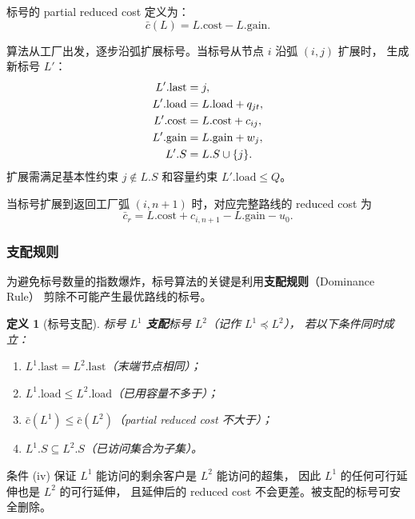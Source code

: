 \documentclass{article}
\newtheorem{definition}{定义}
\begin{document}
标号的 partial reduced cost 定义为：
\begin{equation}
\bar{c}(L) = L.\text{cost} - L.\text{gain}.
\label{eq:partial_rc}
\end{equation}

算法从工厂出发，逐步沿弧扩展标号。当标号从节点 $i$ 沿弧 $(i,j)$ 扩展时，
生成新标号 $L'$：
\begin{align}
L'.\text{last} &= j, \notag \\
L'.\text{load} &= L.\text{load} + q_{jt}, \notag \\
L'.\text{cost} &= L.\text{cost} + c_{ij}, \notag \\
L'.\text{gain} &= L.\text{gain} + w_j, \notag \\
L'.S &= L.S \cup \{j\}. \notag
\end{align}
扩展需满足基本性约束 $j \notin L.S$ 和容量约束 $L'.\text{load} \le Q$。

当标号扩展到返回工厂弧 $(i, n+1)$ 时，对应完整路线的 reduced cost 为
\begin{equation}
\bar{c}_r = L.\text{cost} + c_{i,n+1} - L.\text{gain} - u_0.
\end{equation}

\subsubsection{支配规则}

为避免标号数量的指数爆炸，标号算法的关键是利用\textbf{支配规则}（Dominance Rule）
剪除不可能产生最优路线的标号。

\begin{definition}[标号支配]
标号 $L^1$ \textbf{支配}标号 $L^2$（记作 $L^1 \preceq L^2$），
若以下条件同时成立：
\begin{enumerate}[label=(\roman*)]
  \item $L^1.\text{last} = L^2.\text{last}$（末端节点相同）；
  \item $L^1.\text{load} \le L^2.\text{load}$（已用容量不多于）；
  \item $\bar{c}(L^1) \le \bar{c}(L^2)$（partial reduced cost 不大于）；
  \item $L^1.S \subseteq L^2.S$（已访问集合为子集）。
\end{enumerate}
\end{definition}

条件 (iv) 保证 $L^1$ 能访问的剩余客户是 $L^2$ 能访问的超集，
因此 $L^1$ 的任何可行延伸也是 $L^2$ 的可行延伸，
且延伸后的 reduced cost 不会更差。被支配的标号可安全删除。
\end{document}
